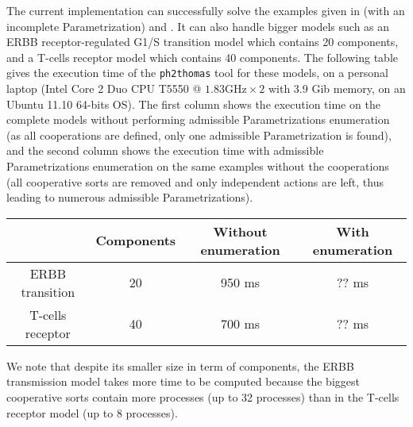 The current implementation can successfully solve the examples given in  (with
an incomplete Parametrization) and . It can also handle bigger models such as
an ERBB receptor-regulated G1/S transition model \cite{Sahin09} which contains 20
components, and a T-cells receptor model \cite{Klamt06} which contains 40 components.
The following table gives the execution time of the \texttt{ph2thomas} tool for these models, on a personal laptop (Intel Core 2 Duo CPU T5550 @ $1.83\text{GHz} \times 2$ with 3.9 Gib memory, on an Ubuntu 11.10 64-bits OS).
The first column shows the execution time on the complete models without performing admissible Parametrizations enumeration (as all cooperations are defined, only one admissible Parametrization is found), and the second column shows the execution time with admissible Parametrizations enumeration on the same examples without the cooperations (all cooperative sorts are removed and only independent actions are left, thus leading to numerous admissible Parametrizations).
\begin{center}
\begin{tabular}{c|c||c|c|}
  & Components & Without enumeration & With enumeration
\\ \hline
ERBB transition & 20 & 950 ms & ?? ms
\\ \hline
T-cells receptor & 40 & 700 ms & ?? ms
\\ \hline
\end{tabular}
\end{center}
We note that despite its smaller size in term of components, the ERBB transmission model takes more time to be computed because the biggest cooperative sorts contain more processes (up to 32 processes) than in the T-cells receptor model (up to 8 processes).

\begin{comment}
\begin{figure}[t]
\centering
\texttt{[image: figs/tcrsig40.png]}
\caption{\label{fig:tcrsig40-ig}
The IG returned by \texttt{ph2thomas} when used on the T-cell receptor PH model.
}
\end{figure}
In the case of the T-cell receptor model, the inferred IG obtained using the implementation is given in figure \pref{fig:tcrsig40-ig}.
\todo{Give the whole model in annex?}
\end{comment}

